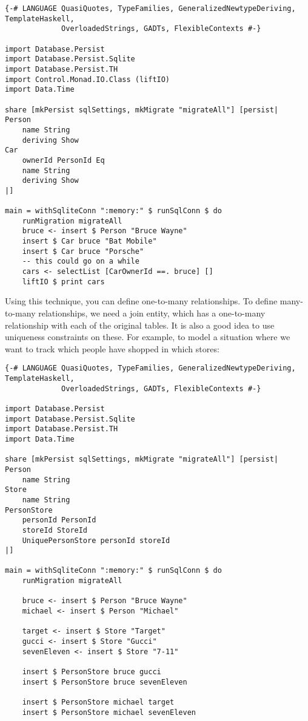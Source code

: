 \begin{lstlisting}
{-# LANGUAGE QuasiQuotes, TypeFamilies, GeneralizedNewtypeDeriving, TemplateHaskell,
             OverloadedStrings, GADTs, FlexibleContexts #-}

import Database.Persist
import Database.Persist.Sqlite
import Database.Persist.TH
import Control.Monad.IO.Class (liftIO)
import Data.Time

share [mkPersist sqlSettings, mkMigrate "migrateAll"] [persist|
Person
    name String
    deriving Show
Car
    ownerId PersonId Eq
    name String
    deriving Show
|]

main = withSqliteConn ":memory:" $ runSqlConn $ do
    runMigration migrateAll
    bruce <- insert $ Person "Bruce Wayne"
    insert $ Car bruce "Bat Mobile"
    insert $ Car bruce "Porsche"
    -- this could go on a while
    cars <- selectList [CarOwnerId ==. bruce] []
    liftIO $ print cars
\end{lstlisting}%
 
Using this technique, you can define one-to-many relationships. To define many-to-many relationships, we need a join entity, which has a one-to-many relationship with each of the original tables. It is also a good idea to use uniqueness constraints on these. For example, to model a situation where we want to track which people have shopped in which stores:

\begin{lstlisting}
{-# LANGUAGE QuasiQuotes, TypeFamilies, GeneralizedNewtypeDeriving, TemplateHaskell,
             OverloadedStrings, GADTs, FlexibleContexts #-}

import Database.Persist
import Database.Persist.Sqlite
import Database.Persist.TH
import Data.Time

share [mkPersist sqlSettings, mkMigrate "migrateAll"] [persist|
Person
    name String
Store
    name String
PersonStore
    personId PersonId
    storeId StoreId
    UniquePersonStore personId storeId
|]

main = withSqliteConn ":memory:" $ runSqlConn $ do
    runMigration migrateAll

    bruce <- insert $ Person "Bruce Wayne"
    michael <- insert $ Person "Michael"

    target <- insert $ Store "Target"
    gucci <- insert $ Store "Gucci"
    sevenEleven <- insert $ Store "7-11"

    insert $ PersonStore bruce gucci
    insert $ PersonStore bruce sevenEleven

    insert $ PersonStore michael target
    insert $ PersonStore michael sevenEleven
\end{lstlisting}%


